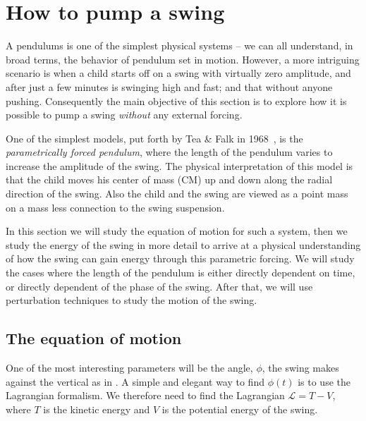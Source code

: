 \documentclass[11pt,letter, swedish, english
]{article}
\begin{document}





\section{How to pump a swing}
A pendulums is one of the simplest physical systems -- we can all
understand, in broad terms, the behavior of pendulum set in
motion. However, a more intriguing scenario is when a child starts off
on a swing with virtually zero amplitude, and after just a few minutes
is swinging high and fast; and that without anyone pushing.
Consequently the main objective of this section is to explore how it
is possible to pump a swing \emph{without} any external forcing. 

One of the simplest models, put forth by Tea \& Falk in
1968~\cite{Tea_Falk_1968}, is the \emph{parametrically forced
  pendulum}, where the length of the pendulum varies to increase the
amplitude of the swing. The physical interpretation of this model is
that the child moves his center of mass (CM) up and down along the radial
direction of the swing. Also the child and the swing are viewed as a
point mass on a mass less connection to the swing suspension. 

In this section we will study the equation of motion for such a system,
then we study the energy of the swing in more detail to arrive at a
physical understanding of how the swing can gain energy through this
parametric forcing. We will study the cases where the length of the
pendulum is either directly dependent on time, or directly dependent
of the phase of the swing.
After that, we will use 
perturbation techniques to study the motion of the swing.

\subsection{The equation of motion}
One of the most interesting parameters will be the angle, $\phi$,
the swing makes against the vertical as in . 
A simple and elegant way to find $\phi(t)$ is to use the Lagrangian
formalism. We therefore need to find the Lagrangian $\mathcal{L}=T-V$,
where $T$ is the kinetic energy and $V$ is the potential energy of the
swing. 
\end{document}
